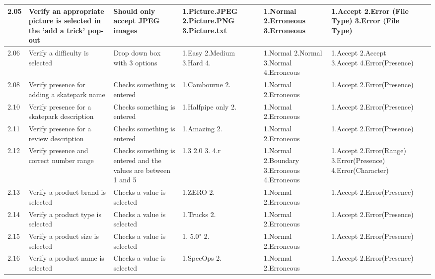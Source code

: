 \begin{landscape}
\begin{center}
\begin{longtable}{|p{1.5cm}|p{2.5cm}|p{2.5cm}|p{2cm}|p{2cm}|p{2cm}|p{2cm}|p{2cm}|}
2.05 & Verify an appropriate picture is selected in the 'add a trick' pop-out & Should only accept JPEG images & 1.Picture.JPEG 2.Picture.PNG 3.Picture.txt & 1.Normal 2.Erroneous 3.Erroneous & 1.Accept 2.Error (File Type) 3.Error (File Type) & & \\ \hline

2.06 & Verify a difficulty is selected & Drop down box with 3 options & 1.Easy 2.Medium 3.Hard 4. & 1.Normal 2.Normal 3.Normal 4.Erroneous & 1.Accept 2.Accept 3.Accept 4.Error(Presence) & & \\ \hline


2.08 & Verify presence for adding a skatepark name & Checks something is entered & 1.Cambourne 2.  & 1.Normal 2.Erroneous & 1.Accept 2.Error(Presence) & & \\ \hline 



2.10 & Verify presence for a skatepark description & Checks something is entered & 1.Halfpipe only 2.  & 1.Normal 2.Erroneous & 1.Accept 2.Error(Presence) & & \\ \hline

2.11 & Verify presence for a review description & Checks something is entered & 1.Amazing 2. & 1.Normal 2.Erroneous & 1.Accept 2.Error(Presence) & & \\ \hline

2.12 & Verify presence and correct number range & Checks something is entered and the values are between 1 and 5 & 1.3 2.0 3. 4.r & 1.Normal 2.Boundary 3.Erroneous 4.Erroneous & 1.Accept 2.Error(Range) 3.Error(Presence) 4.Error(Character) & & \\ \hline

2.13 & Verify a product brand is selected & Checks a value is selected & 1.ZERO 2. & 1.Normal 2.Erroneous & 1.Accept 2.Error(Presence) & & \\ \hline

2.14 & Verify a product type is selected & Checks a value is selected & 1.Trucks 2. & 1.Normal 2.Erroneous & 1.Accept 2.Error(Presence) & & \\ \hline

2.15 & Verify a product size is selected & Checks a value is selected & 1. 5.0" 2. & 1.Normal 2.Erroneous & 1.Accept 2.Error(Presence) & & \\ \hline

2.16 & Verify a product name is selected & Checks a value is selected & 1.SpecOps 2. & 1.Normal 2.Erroneous & 1.Accept 2.Error(Presence) & & \\ \hline






\end{longtable}
\end{center}
\end{landscape}
